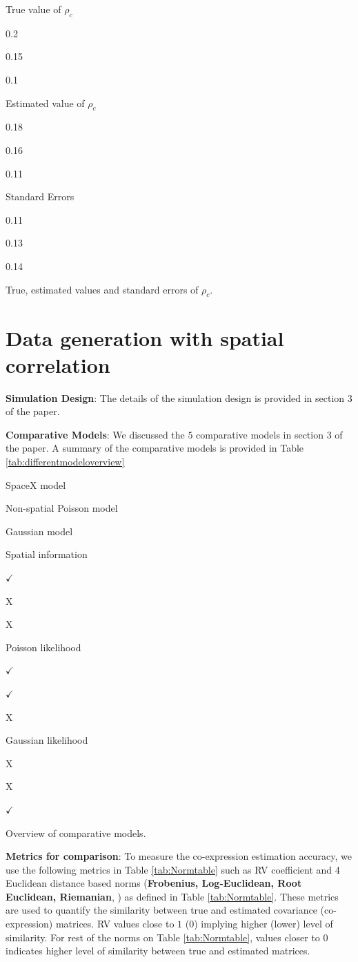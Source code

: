 \documentclass[
]{book}
\begin{document}
True value of \(\rho_{c}\)

0.2

0.15

0.1

Estimated value of \(\rho_{c}\)

0.18

0.16

0.11

Standard Errors

0.11

0.13

0.14

\label{tab:rhoest} True, estimated values and standard errors of \(\rho_{c}\).

\hypertarget{data-generation-with-spatial-correlation}{%
\section{Data generation with spatial correlation}\label{data-generation-with-spatial-correlation}}

\textbf{Simulation Design}: The details of the simulation design is provided in section 3 of the paper.

\textbf{Comparative Models}: We discussed the \(5\) comparative models in section 3 of the paper. A summary of the comparative models is provided in Table \ref{tab:differentmodeloverview}

SpaceX model

Non-spatial Poisson model

Gaussian model

Spatial information

\(\checkmark\)

X

X

Poisson likelihood

\(\checkmark\)

\(\checkmark\)

X

Gaussian likelihood

X

X

\(\checkmark\)

\label{tab:differentmodeloverview} Overview of comparative models.

\textbf{Metrics for comparison}: To measure the co-expression estimation accuracy, we use the following metrics in Table \ref{tab:Normtable} such as RV coefficient \citep{robert1976unifying} and 4 Euclidean distance based norms (\textbf{Frobenius, Log-Euclidean, Root Euclidean, Riemanian}, \citet{dryden2009non}) as defined in Table \ref{tab:Normtable}. These metrics are used to quantify the similarity between true and estimated covariance (co-expression) matrices. RV values close to \(1\) (\(0\)) implying higher (lower) level of similarity. For rest of the norms on Table \ref{tab:Normtable}, values closer to \(0\) indicates higher level of similarity between true and estimated matrices.
\end{document}
